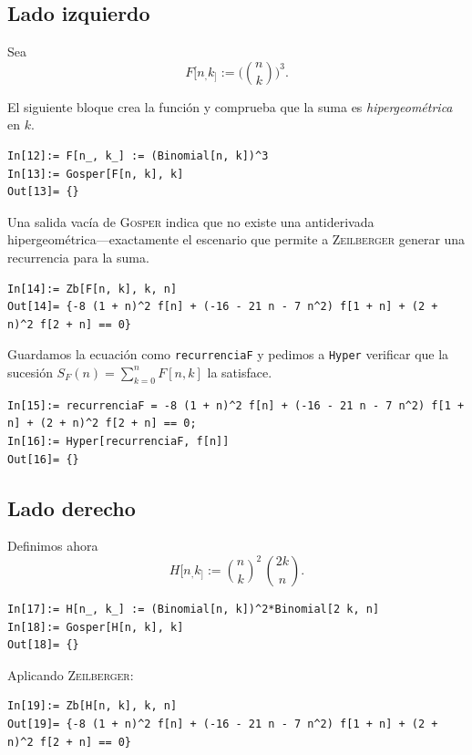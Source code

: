 \begin{solucion}
\subsection*{Lado izquierdo}
Sea
\[
  F[n_,k_] := \bigl(\binom{n}{k}\bigr)^{3}.
\]

El siguiente bloque crea la función y comprueba que la suma es \emph{hipergeométrica} en $k$.

\begin{lstlisting}[caption={Definición de \texttt{F} y aplicación de Gosper}]
In[12]:= F[n_, k_] := (Binomial[n, k])^3
In[13]:= Gosper[F[n, k], k]
Out[13]= {}
\end{lstlisting}

Una salida vacía de \textsc{Gosper} indica que no existe una antiderivada hipergeométrica—exactamente el escenario
que permite a \textsc{Zeilberger} generar una recurrencia para la suma.

\begin{lstlisting}[caption={Recurrencia obtenida vía \textsc{Zeilberger}}]
In[14]:= Zb[F[n, k], k, n]
Out[14]= {-8 (1 + n)^2 f[n] + (-16 - 21 n - 7 n^2) f[1 + n] + (2 + n)^2 f[2 + n] == 0}
\end{lstlisting}

Guardamos la ecuación como \texttt{recurrenciaF} y pedimos a \texttt{Hyper} verificar que la sucesión
$S_F(n)=\sum_{k=0}^{n} F[n,k]$ la satisface.

\begin{lstlisting}[caption={Verificación automática de la recurrencia}]
In[15]:= recurrenciaF = -8 (1 + n)^2 f[n] + (-16 - 21 n - 7 n^2) f[1 + n] + (2 + n)^2 f[2 + n] == 0;
In[16]:= Hyper[recurrenciaF, f[n]]
Out[16]= {}
\end{lstlisting}

\subsection*{Lado derecho}
Definimos ahora
\[
  H[n_,k_] := \binom{n}{k}^{2}\,\binom{2k}{n}.
\]

\begin{lstlisting}[caption={Definición de \texttt{H} y aplicación de Gosper}]
In[17]:= H[n_, k_] := (Binomial[n, k])^2*Binomial[2 k, n]
In[18]:= Gosper[H[n, k], k]
Out[18]= {}
\end{lstlisting}

Aplicando \textsc{Zeilberger}:

\begin{lstlisting}[caption={Recurrencia para el lado derecho}]
In[19]:= Zb[H[n, k], k, n]
Out[19]= {-8 (1 + n)^2 f[n] + (-16 - 21 n - 7 n^2) f[1 + n] + (2 + n)^2 f[2 + n] == 0}
\end{lstlisting}


\end{solucion}
